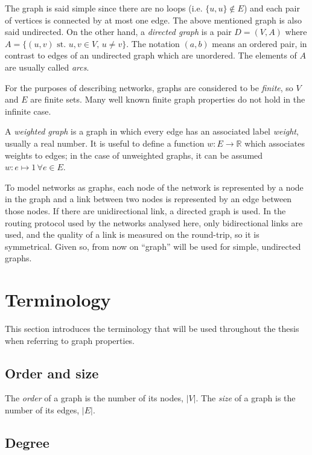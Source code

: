 \documentclass[a4paper,11pt,twoside,openleft]{memoir}
\newcommand{\st}{\text{ st. }}
\begin{document}
The graph is said simple since there are no loops (i.e.
$\{u,u\} \not\in E$) and each pair of vertices is connected by at most
one edge. The above mentioned graph is also said undirected. On the
other hand, a \emph{directed graph} is a pair $D = (V, A)$ where
$A = \{(u,v) \st u,v \in V,\, u \neq v\}$. The notation $(a,b)$ means
an ordered pair, in contrast to edges of an undirected graph
which are unordered. The elements of $A$ are
usually called \emph{arcs}.

For the purposes of describing networks, graphs are considered to be
\emph{finite}, so $V$ and $E$ are finite sets. Many well known finite
graph properties do not hold in the infinite case.

A \emph{weighted graph} is a graph in which every edge has an associated
label \emph{weight}, usually a real number. It is useful to define a
function $w: E \rightarrow \mathbb{R}$ which associates weights to
edges; in the case of unweighted graphs, it can be assumed
$w: e \mapsto 1\, \forall e \in E$.

To model networks as graphs, each node of the network is represented by
a node in the graph and a link between two nodes is represented by an
edge between those nodes. If there are unidirectional link, a directed
graph is used. In the routing protocol used by the networks analysed here,
only bidirectional links are used, and the quality of a link is measured
on the round-trip, so it is symmetrical. Given so, from now on ``graph''
will be used for simple, undirected graphs.

\section{Terminology}\label{terminology}

This section introduces the terminology that will be used throughout
the thesis when referring to graph properties.

\subsection{Order and size}\label{order-and-size}

The \emph{order} of a graph is the number of its nodes, $|V|$. The
\emph{size} of a graph is the number of its edges, $|E|$.

\subsection{Degree}\label{degree}
\end{document}
